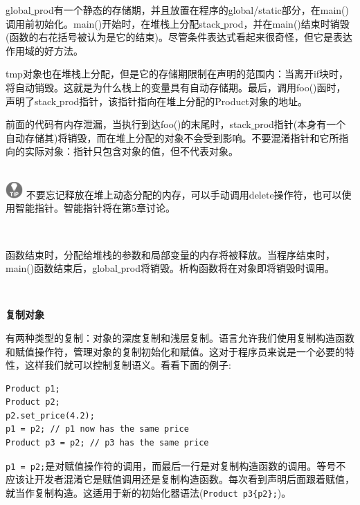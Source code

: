global\underline{ }prod有一个静态的存储期，并且放置在程序的global/static部分，在main()调用前初始化。main()开始时，在堆栈上分配stack\underline{ }prod，并在main()结束时销毁(函数的右花括号被认为是它的结束)。尽管条件表达式看起来很奇怪，但它是表达作用域的好方法。\par
tmp对象也在堆栈上分配，但是它的存储期限制在声明的范围内：当离开if块时，将自动销毁。这就是为什么栈上的变量具有自动存储期。最后，调用foo()函时，声明了stack\underline{ }prod指针，该指针指向在堆上分配的Product对象的地址。 \par
前面的代码有内存泄漏，当执行到达foo()的末尾时，stack\underline{ }prod指针(本身有一个自动存储其)将销毁，而在堆上分配的对象不会受到影响。不要混淆指针和它所指向的实际对象：指针只包含对象的值，但不代表对象。 \par

\hspace*{\fill} \\ %
\includegraphics[width=0.05\textwidth]{images/tip}
不要忘记释放在堆上动态分配的内存，可以手动调用delete操作符，也可以使用智能指针。智能指针将在第5章讨论。 \par
\noindent\textbf{}\ \par

函数结束时，分配给堆栈的参数和局部变量的内存将被释放。当程序结束时，main()函数结束后，global\underline{ }prod将销毁。析构函数将在对象即将销毁时调用。 \par

\noindent\textbf{}\ \par
\textbf{复制对象} \ \par
有两种类型的复制：对象的深度复制和浅层复制。语言允许我们使用复制构造函数和赋值操作符，管理对象的复制初始化和赋值。这对于程序员来说是一个必要的特性，这样我们就可以控制复制语义。看看下面的例子: \par

\begin{lstlisting}[caption={}]
Product p1;
Product p2;
p2.set_price(4.2);
p1 = p2; // p1 now has the same price
Product p3 = p2; // p3 has the same price
\end{lstlisting}

\texttt{p1 = p2;}是对赋值操作符的调用，而最后一行是对复制构造函数的调用。等号不应该让开发者混淆它是赋值调用还是复制构造函数。每次看到声明后面跟着赋值，就当作复制构造。这适用于新的初始化器语法(\texttt{Product p3\{p2\};})。 \par

